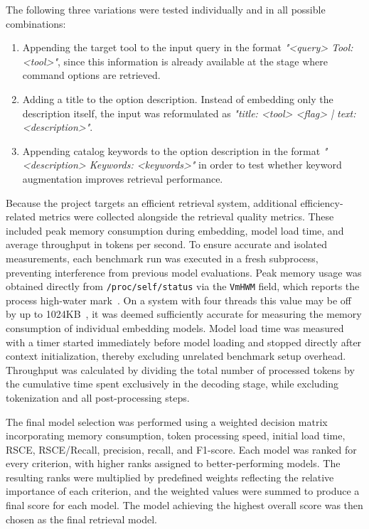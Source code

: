 The following three variations were tested individually and in all possible combinations:

\begin{enumerate}
    \item Appending the target tool to the input query in the format \textit{"<query> Tool: <tool>"}, since this information is already available at the stage where command options are retrieved.
    \item Adding a title to the option description. Instead of embedding only the description itself, the input was reformulated as \textit{"title: <tool> <flag> | text: <description>"}. 
    \item Appending catalog keywords to the option description in the format \textit{"<description> Keywords: <keywords>"} in order to test whether keyword augmentation improves retrieval performance.
\end{enumerate}

Because the project targets an efficient retrieval system, additional efficiency-related metrics were collected alongside the retrieval quality metrics. These included peak memory consumption during embedding, model load time, and average throughput in tokens per second. To ensure accurate and isolated measurements, each benchmark run was executed in a fresh subprocess, preventing interference from previous model evaluations. Peak memory usage was obtained directly from \texttt{/proc/self/status} via the \texttt{VmHWM} field, which reports the process high-water mark~\cite{linuxmanprocstatus}. On a system with four threads this value may be off by up to 1024KB~\cite{brindus2020kernel}, it was deemed sufficiently accurate for measuring the memory consumption of individual embedding models. Model load time was measured with a timer started immediately before model loading and stopped directly after context initialization, thereby excluding unrelated benchmark setup overhead. Throughput was calculated by dividing the total number of processed tokens by the cumulative time spent exclusively in the decoding stage, while excluding tokenization and all post-processing steps.

The final model selection was performed using a weighted decision matrix incorporating memory consumption, token processing speed, initial load time, \ac{RSCE}, \ac{RSCE}/Recall, precision, recall, and F1-score. Each model was ranked for every criterion, with higher ranks assigned to better-performing models. The resulting ranks were multiplied by predefined weights reflecting the relative importance of each criterion, and the weighted values were summed to produce a final score for each model. The model achieving the highest overall score was then chosen as the final retrieval model.

